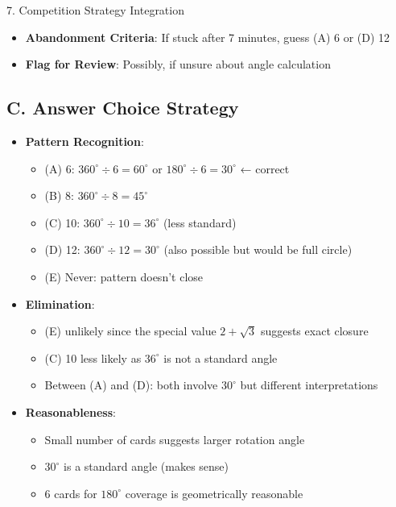 \documentclass[12pt]{article}
\begin{document}
\begin{competitionbox}{7. Competition Strategy Integration}
\begin{itemize}[leftmargin=*]
    \item \textbf{Abandonment Criteria}: If stuck after 7 minutes, guess (A) 6 or (D) 12
    
    \item \textbf{Flag for Review}: Possibly, if unsure about angle calculation
\end{itemize}

\subsection*{C. Answer Choice Strategy}
\begin{itemize}[leftmargin=*]
    \item \textbf{Pattern Recognition}:
    \begin{itemize}
        \item (A) 6: $360^\circ \div 6 = 60^\circ$ or $180^\circ \div 6 = 30^\circ$ ← correct
        \item (B) 8: $360^\circ \div 8 = 45^\circ$
        \item (C) 10: $360^\circ \div 10 = 36^\circ$ (less standard)
        \item (D) 12: $360^\circ \div 12 = 30^\circ$ (also possible but would be full circle)
        \item (E) Never: pattern doesn't close
    \end{itemize}
    
    \item \textbf{Elimination}:
    \begin{itemize}
        \item (E) unlikely since the special value $2+\sqrt{3}$ suggests exact closure
        \item (C) 10 less likely as $36^\circ$ is not a standard angle
        \item Between (A) and (D): both involve $30^\circ$ but different interpretations
    \end{itemize}
    
    \item \textbf{Reasonableness}:
    \begin{itemize}
        \item Small number of cards suggests larger rotation angle
        \item $30^\circ$ is a standard angle (makes sense)
        \item 6 cards for $180^\circ$ coverage is geometrically reasonable
    \end{itemize}
\end{itemize}


\end{competitionbox}
\end{document}
